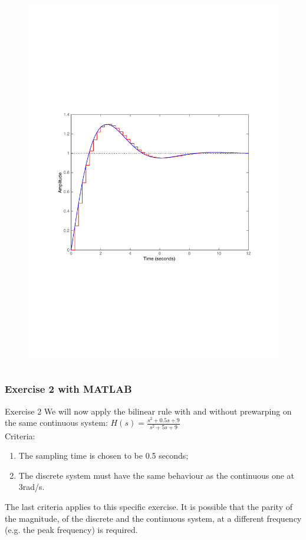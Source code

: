 \begin{frame}
\begin{columns}
\begin{column}{0.5\textwidth}
\begin{figure}
				\includegraphics[width=1\linewidth]{vb4}
			\end{figure}
		\end{column}
	\end{columns}
\end{frame}

\begin{frame}
	\frametitle{Exercise 2 with MATLAB}
	\begin{block}{Exercise 2}
		We will now apply the bilinear rule with and without prewarping on the same continuous system: $H(s) = \frac{s^{2} + 0.5s + 9}{s^{2} + 5s + 9}$\\
		\vspace{0.5em}
		Criteria: 
		\begin{enumerate}
			\item The sampling time is chosen to be 0.5 seconds;\\
			\item The discrete system must have the same behaviour as the continuous one at 3rad/s.
		\end{enumerate}
		\vspace{0.5em}
		The last criteria applies to this specific exercise. It is possible that the parity of the magnitude, of the discrete and the continuous system, at a different frequency (e.g. the peak frequency) is required.
	\end{block}	
\end{frame}
		
